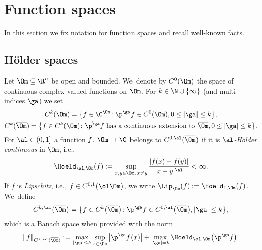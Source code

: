 \section{Function spaces}\label{functionspaces}

In this section we fix notation for function spaces and recall well-known facts.

\subsection{H\"older spaces}

Let $\Om \subseteq \R^n$ be open and bounded. We~denote by $C^0(\Om)$ the space of continuous complex valued functions on $\Om$.
For $k \in \N \cup \{\infty\}$ (and multi-indices $\ga$) we set
\begin{gather*}
 C^k(\Om)= \big\{f \in \C^\Om \colon \p^\ga f \in C^0(\Om), 0 \le |\ga| \le k\big\},
 \\
 C^k(\overline \Om) = \big\{f \in C^k(\Om) \colon \p^\ga f \text{ has a continuous extension to } \overline \Om, 0 \le |\ga| \le k\big\}.
\end{gather*}
For $\al \in (0,1]$ a function $f \colon \Om \to \C$ belongs to $C^{0,\al}(\overline \Om)$ if it is \emph{$\al$-H\"older continuous}
in $\Om$, i.e.,
\begin{gather*}
\Hoeld_{\al,\Om}(f) := \sup_{x,y \in \Om,\, x \ne y} \frac{|f(x)-f(y)|}{|x-y|^\al} < \infty.
\end{gather*}
If $f$ is \emph{Lipschitz}, i.e., $f \in C^{0,1}\big(\ol \Om\big)$, we write
$\Lip_\Om (f) :=\Hoeld_{1,\Om}(f)$. We~define
\begin{gather*}
 C^{k,\al}\big(\overline \Om\big) =\big \{f \in C^k\big(\overline \Om\big) \colon \p^\ga f \in C^{0,\al}\big(\overline \Om\big), |\ga|\le k\big\},
\end{gather*}
which is a Banach space when provided with the norm
\begin{gather*}
\|f\|_{C^{k,\al}(\overline \Om)}
:= \max_{|\ga| \le k} \sup_{x \in \Om} \big|\p^\ga f(x)\big| + \max_{|\ga|=k} \Hoeld_{\al,\Om}\big(\p^\ga f\big).
\end{gather*}

